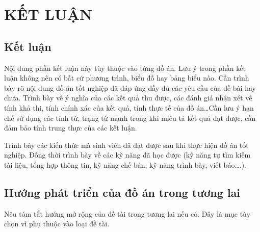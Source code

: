 \chapter{KẾT LUẬN}
\label{chap:ketluan}

\section{Kết luận}
\label{sec:ketluan}
Nội dung phần kết luận này tùy thuộc vào từng đồ án. Lưu ý trong phần kết luận không nên có bất cứ phương trình, biểu đồ hay bảng biểu nào. Cần trình bày rõ nội dung đồ án tốt nghiệp đã đáp ứng đầy đủ các yêu cầu của đề bài hay chưa. Trình bày về ý nghĩa của các kết quả thu được, các đánh giá nhận xét về tính khả thi, tính chính xác của kết quả, tính thực tế của đồ án…Cần lưu ý hạn chế sử dụng các tính từ, trạng từ mạnh trong khi miêu tả kết quả đạt được, cần đảm bảo tính trung thực của các kết luận.

Trình bày các kiến thức mà sinh viên đã đạt được sau khi thực hiện đồ án tốt nghiệp. Đồng thời trình bày về các kỹ năng đã học được (kỹ năng tự tìm kiếm tài liệu, tổng hợp thông tin, kỹ năng chế bản, kỹ năng trình bày, viết báo….).

\section{Hướng phát triển của đồ án trong tương lai}
\label{sec:phattrien}
Nêu tóm tắt hướng mở rộng của đề tài trong tương lai nếu có. Đây là mục tùy chọn vì phụ thuộc vào loại đề tài.


